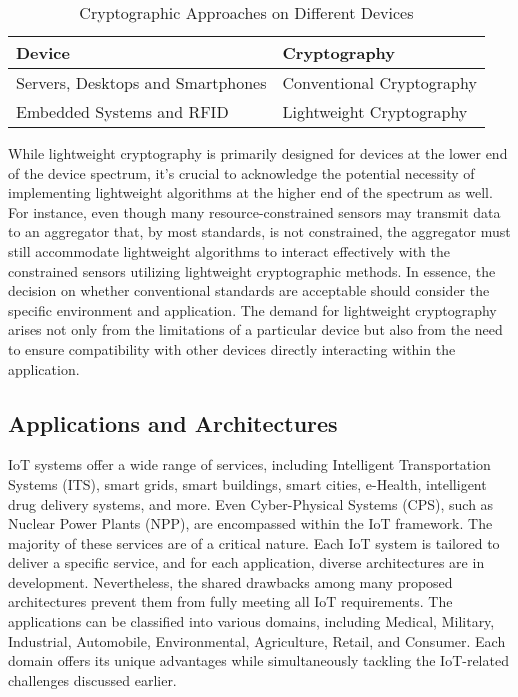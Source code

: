 \documentclass[conference,compsoc]{IEEEtran}
\begin{document}
\begin{table}[ht]
    \centering
    \caption{Cryptographic Approaches on Different Devices}
    \begin{tabular}{ll}
        \toprule
        \textbf{Device} & \textbf{Cryptography} \\
        \midrule
        Servers, Desktops and Smartphones & Conventional Cryptography \\
        Embedded Systems and RFID & Lightweight Cryptography \\
        \bottomrule
    \end{tabular}
    \label{table:crypto_devices}
\end{table}

While lightweight cryptography is primarily designed for devices at the lower end of the device spectrum, it's crucial to acknowledge the potential necessity of implementing lightweight algorithms at the higher end of the spectrum as well. For instance, even though many resource-constrained sensors may transmit data to an aggregator that, by most standards, is not constrained, the aggregator must still accommodate lightweight algorithms to interact effectively with the constrained sensors utilizing lightweight cryptographic methods. In essence, the decision on whether conventional standards are acceptable should consider the specific environment and application. The demand for lightweight cryptography arises not only from the limitations of a particular device but also from the need to ensure compatibility with other devices directly interacting within the application.
\subsection{Applications and Architectures}
IoT systems offer a wide range of services, including Intelligent Transportation Systems (ITS), smart grids, smart buildings, smart cities, e-Health, intelligent drug delivery systems, and more. Even Cyber-Physical Systems (CPS), such as Nuclear Power Plants (NPP), are encompassed within the IoT framework. The majority of these services are of a critical nature. Each IoT system is tailored to deliver a specific service, and for each application, diverse architectures are in development. 
Nevertheless, the shared drawbacks among many proposed architectures prevent them from fully meeting all IoT requirements. The applications can be classified into various domains, including Medical, Military, Industrial, Automobile, Environmental, Agriculture, Retail, and Consumer. Each domain offers its unique advantages while simultaneously tackling the IoT-related challenges discussed earlier.
\end{document}
